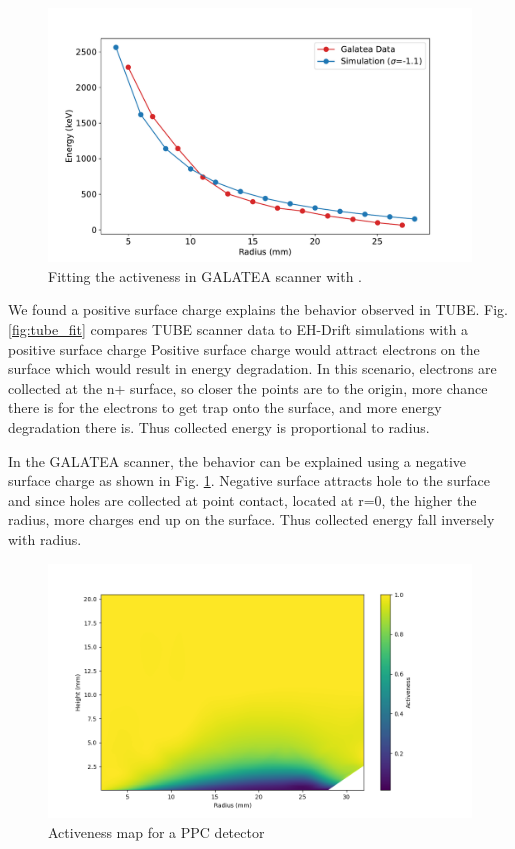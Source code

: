 \begin{figure}
\includegraphics[trim={0.3cm 0.1cm 1.7cm 0.1cm},clip,width=\linewidth]{ch5/figs/gal_fit.pdf}
\caption{Fitting the activeness in GALATEA scanner with \tdsim{}.}
\label{fig:gal_fit}
\end{figure}

We found a positive surface charge explains the behavior observed in TUBE. Fig. \ref{fig:tube_fit} compares TUBE scanner data to EH-Drift simulations with a positive surface charge Positive surface charge would attract electrons on the surface which would result in energy degradation. In this scenario, electrons are collected at the n+ surface, so closer the points are to the origin, more chance there is for the electrons to get trap onto the surface, and more energy degradation there is. Thus collected energy is proportional to radius.



In the GALATEA scanner, the behavior can be explained using a negative surface charge as shown in Fig. \ref{fig:gal_fit}. Negative surface attracts hole to the surface and since holes are collected at point contact, located at r=0, the higher the radius, more charges end up on the surface. Thus collected energy fall inversely with radius.



\begin{figure}
\includegraphics[trim={1.6cm 0.5cm 3.2cm 1cm},clip,width=\linewidth]{ch5/figs/activeness_cubic_fit_with_mask.png}
\caption{Activeness map for a PPC detector \tdsim}
\label{fig:activeness_map}
\end{figure}

